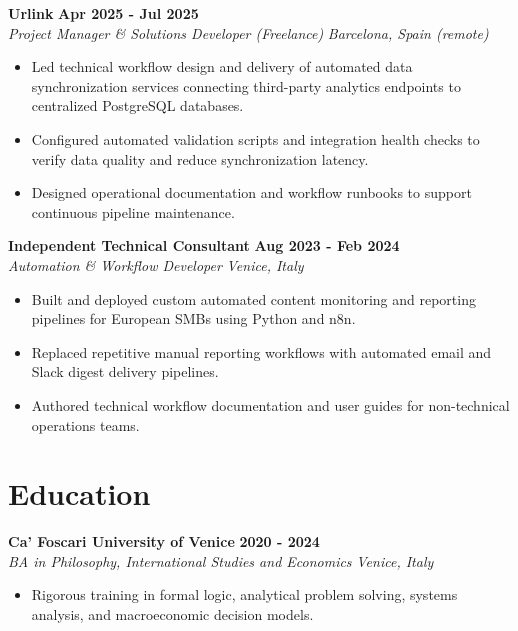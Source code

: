 \documentclass[10pt,a4paper]{article}
\newcommand{\role}[4]{%
  \textbf{#1} \hfill \textbf{#2}\\[1pt]%
  \textit{#3} \hfill \textit{#4}\\[2pt]%
}
\begin{document}
\role{Urlink}{Apr 2025 - Jul 2025}{Project Manager \& Solutions Developer (Freelance)}{Barcelona, Spain (remote)}
\begin{itemize}
  \item Led technical workflow design and delivery of automated data synchronization services connecting third-party analytics endpoints to centralized PostgreSQL databases.
  \item Configured automated validation scripts and integration health checks to verify data quality and reduce synchronization latency.
  \item Designed operational documentation and workflow runbooks to support continuous pipeline maintenance.
\end{itemize}

\role{Independent Technical Consultant}{Aug 2023 - Feb 2024}{Automation \& Workflow Developer}{Venice, Italy}
\begin{itemize}
  \item Built and deployed custom automated content monitoring and reporting pipelines for European SMBs using Python and n8n.
  \item Replaced repetitive manual reporting workflows with automated email and Slack digest delivery pipelines.
  \item Authored technical workflow documentation and user guides for non-technical operations teams.
\end{itemize}

\section{Education}
\role{Ca' Foscari University of Venice}{2020 - 2024}{BA in Philosophy, International Studies and Economics}{Venice, Italy}
\begin{itemize}
  \item Rigorous training in formal logic, analytical problem solving, systems analysis, and macroeconomic decision models.
\end{itemize}
\end{document}
